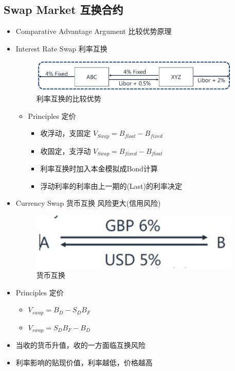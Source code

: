 \documentclass[a4paper,6pt,twoside,openany]{article}
\begin{document}
\subsection{Swap Market 互换合约}
\begin{itemize}
\item Comparative Advantage Argument 比较优势原理
\item Interest Rate Swap 利率互换
  \begin{figure}[!htbp]
    \centering \includegraphics[width=100mm]{figures/Swap_Interest.jpg}
    \caption{利率互换的比较优势}
  \end{figure}
  \begin{itemize}
  \item Principles 定价
    \begin{itemize}
    \item 收浮动，支固定 $V_{Swap} = B_{float} - B_{fixed}$
    \item 收固定，支浮动 $V_{Swap} = B_{fixed} - B_{float}$
    \item 利率互换时加入本金模拟成Bond计算
    \item 浮动利率的利率由上一期的(Last)的利率决定
    \end{itemize}
  \end{itemize}
\item Currency Swap 货币互换 风险更大(信用风险)
\begin{figure}[!htbp]
  \centering \includegraphics[width=100mm]{figures/Swap_Currency.jpg}
  \caption{货币互换}
\end{figure}
  \item Principles 定价
    \begin{itemize}
    \item $V_{swap} = B_D - S_DB_F$
    \item $V_{swap} = S_DB_F - B_D$
    \end{itemize}
  \item 当收的货币升值，收的一方面临互换风险
  \item 利率影响的贴现价值，利率越低，价格越高
\end{itemize}
\end{document}

